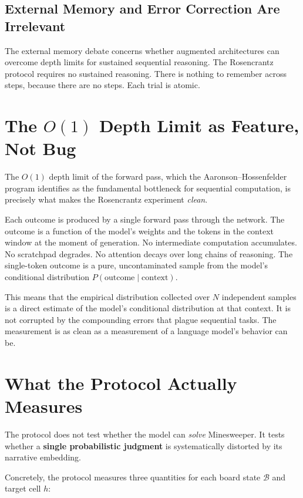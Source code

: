 \documentclass[12pt,a4paper]{article}
\begin{document}
\subsection{External Memory and Error Correction Are Irrelevant}

The external memory debate \citep{aaronson2026_external,hossenfelder2026_error} concerns whether augmented architectures can overcome depth limits for sustained sequential reasoning. The Rosencrantz protocol requires no sustained reasoning. There is nothing to remember across steps, because there are no steps. Each trial is atomic.

\section{The $O(1)$ Depth Limit as Feature, Not Bug}

The $O(1)$ depth limit of the forward pass, which the Aaronson--Hossenfelder program identifies as the fundamental bottleneck for sequential computation, is precisely what makes the Rosencrantz experiment \emph{clean}.

Each outcome is produced by a single forward pass through the network. The outcome is a function of the model's weights and the tokens in the context window at the moment of generation. No intermediate computation accumulates. No scratchpad degrades. No attention decays over long chains of reasoning. The single-token outcome is a pure, uncontaminated sample from the model's conditional distribution $P(\text{outcome} \mid \text{context})$.

This means that the empirical distribution collected over $N$ independent samples is a direct estimate of the model's conditional distribution at that context. It is not corrupted by the compounding errors that plague sequential tasks. The measurement is as clean as a measurement of a language model's behavior can be.

\section{What the Protocol Actually Measures}

The protocol does not test whether the model can \emph{solve} Minesweeper. It tests whether a \textbf{single probabilistic judgment} is systematically distorted by its narrative embedding.

Concretely, the protocol measures three quantities for each board state $\mathcal{B}$ and target cell $h$:
\end{document}
